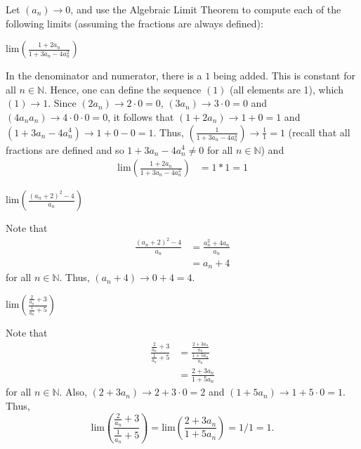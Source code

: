 \documentclass[12pt]{article}
\newcommand{\N}{\mathbb{N}}
\newcommand{\Lim}[1]{\mathrm{lim}\left( #1\right)}
\newenvironment{problem}[2][Problem]{\begin{trivlist} \item[\hskip \labelsep {\bfseries #1}\hskip \labelsep {\bfseries #2.}]}{\end{trivlist}}
\newenvironment{solution}[1][Solution]{\begin{trivlist} \item[\hskip \labelsep {\bfseries #1}]}{\end{trivlist}}
\begin{document}
    \begin{problem}{2.3.4} 
      Let $(a_{n})\to 0$, and use the Algebraic Limit Theorem to compute each of the following limits (assuming the fractions are always defined):
    \begin{enumerate}
      \item $\Lim{\frac{1+2a_{n}}{1+3a_{n}-4a_{n}^{2}}}$
    \begin{solution}
      In the denominator and numerator, there is a $1$ being added. This is constant for all $n\in \N$. Hence, one can define the sequence $(1)$ (all elements are 1), which $(1) \to 1$. Since $(2a_{n}) \to 2\cdot 0 = 0$, $(3a_{n}) \to 3\cdot 0 = 0$ and $(4a_{n}a_{n}) \to 4\cdot 0\cdot 0 = 0$, it follows that $\left( 1+2a_{n} \right)\to 1+0 = 1$ and $\left( 1+3a_{n}-4a_{n}^{4} \right)\to 1+ 0 -0= 1$. Thus, $\left( \frac{1}{1+3a_{n}-4a_{n}^{4}} \right)\to \frac{1}{1}=1$ (recall that all fractions are defined and so $1+3a_{n}-4a_{n}^{4}\neq 0$ for all $n\in \N$) and 
    \begin{align*}
      \Lim{\frac{1+2a_{n}}{1+3a_{n}-4a_{n}^{2}}} &= 1*1 = 1
    \end{align*}
    \end{solution}
      \item $\Lim{\frac{(a_{n}+2)^{2}-4}{a_{n}}}$
    \begin{solution}
      Note that  
    \begin{align*}
      \frac{(a_{n}+2)^{2}-4}{a_{n}} &= \frac{a_{n}^{2}+4a_{n}}{a_{n}}\\
      &= a_{n} + 4
    \end{align*}
    for all $n\in \N$. Thus, $(a_{n}+4) \to 0+4 = 4$.
    \end{solution}
      \item $\Lim{\frac{\frac{2}{a_{n}}+3}{\frac{1}{a_{n}}+5}}$
    \begin{solution}
      Note that
    \begin{align*}
      \frac{\frac{2}{a_{n}}+3}{\frac{1}{a_{n}}+5} &= \frac{\frac{2+3a_{n}}{a_{n}}}{\frac{1+5a_{n}}{a_{n}}}\\
      &= \frac{2+3a_{n}}{1+5a_{n}}
    \end{align*}
    for all $n\in \N$. Also, $(2+3a_{n})\to 2+3\cdot0 = 2$ and $(1+5a_{n})\to 1+5\cdot0 = 1$. Thus, 
    \begin{equation*}
      \Lim{\frac{\frac{2}{a_{n}}+3}{\frac{1}{a_{n}}+5}} = \Lim{\frac{2+3a_{n}}{1+5a_{n}}} = 1/1=1.
    \end{equation*}
    \end{solution}
    \end{enumerate}
    \end{problem}
\end{document}
